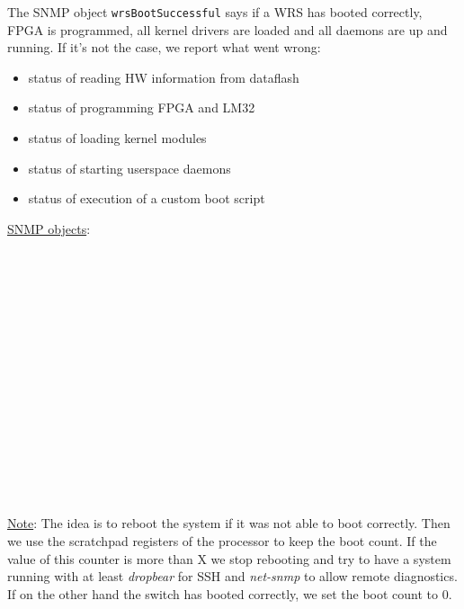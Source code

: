 \begin{pck_descr}
				The SNMP object \texttt{wrsBootSuccessful} says if a WRS has booted
				correctly, FPGA is programmed, all kernel drivers are loaded and all
				daemons are up and running. If it's not the case, we report what went
				wrong:
				\begin{itemize}
					\item status of reading HW information from dataflash
					\item status of programming FPGA and LM32
					\item status of loading kernel modules
					\item status of starting userspace daemons
					\item status of execution of a custom boot script
				\end{itemize}
			\item [] \underline{SNMP objects}:\\
        {\footnotesize
				\\
				\\
				\\
				\\
				\\
				\\
				\\
				\\
				\\
				\\
				\\
				\\
				\\
				 \\
				\\
         }
			\item [] \underline{Note}: 
				The idea is to reboot the system if it was not able to boot correctly.
				Then we use the scratchpad registers of the processor to keep
				the boot count. If the value of this counter is more than X we stop
				rebooting and try to have a system running with at least \emph{dropbear}
				for SSH and \emph{net-snmp} to allow remote diagnostics. If on the other
				hand the switch has booted correctly, we set the boot count to 0.
		\end{pck_descr}

